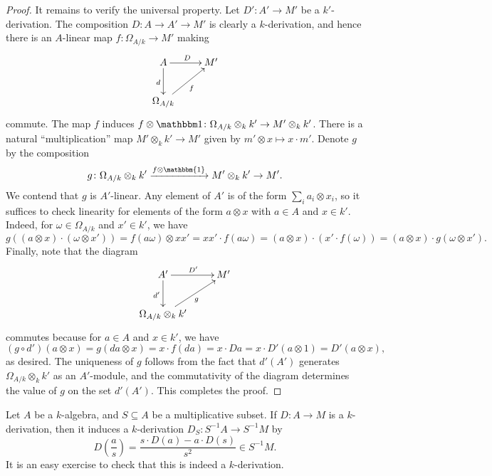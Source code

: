 \documentclass[10pt]{article}
\theoremstyle{thmstyle}
\theoremstyle{defstyle}
\begin{document}
\begin{proof}
    It remains to verify the universal property. Let $D'\colon A'\to M'$ be a $k'$-derivation. The composition $D\colon A\to A'\to M'$ is clearly a $k$-derivation, and hence there is an $A$-linear map $f\colon \Omega_{A/k}\to M'$ making 
    \begin{equation*}
        \xymatrix {
            A\ar[r]^D\ar[d]_d & M'\\
            \Omega_{A/k}\ar[ru]_{f}
        }
    \end{equation*}
    commute. The map $f$ induces $f\otimes\mathbbm 1\colon \Omega_{A/k}\otimes_k k'\to M'\otimes_k k'$. There is a natural ``multiplication'' map $M'\otimes_k k'\to M'$ given by $m'\otimes x\mapsto x\cdot m'$. Denote $g$ by the composition
    \begin{equation*}
        g\colon \Omega_{A/k}\otimes_k k'\xrightarrow{f\otimes\mathbbm{1}} M'\otimes_k k'\to M'.
    \end{equation*}
    We contend that $g$ is $A'$-linear. Any element of $A'$ is of the form $\sum_i a_i\otimes x_i$, so it suffices to check linearity for elements of the form $a\otimes x$ with $a\in A$ and $x\in k'$. Indeed, for $\omega\in\Omega_{A/k}$ and $x'\in k'$, we have 
    \begin{equation*}
        g\left((a\otimes x)\cdot(\omega\otimes x')\right) = f(a\omega)\otimes xx' = xx'\cdot f(a\omega) = (a\otimes x)\cdot (x'\cdot f(\omega)) = (a\otimes x)\cdot g(\omega\otimes x').
    \end{equation*}
    Finally, note that the diagram 
    \begin{equation*}
        \xymatrix {
            A'\ar[d]_{d'}\ar[r]^{D'} & M'\\
            \Omega_{A/k}\otimes_k k'\ar[ru]_{g}
        }
    \end{equation*}
    commutes because for $a\in A$ and $x\in k'$, we have 
    \begin{equation*}
        (g\circ d')(a\otimes x) = g\left(da\otimes x\right) = x\cdot f(da) = x\cdot Da = x\cdot D'(a\otimes 1) = D'(a\otimes x),
    \end{equation*}
    as desired. The uniqueness of $g$ follows from the fact that $d'(A')$ generates $\Omega_{A/k}\otimes_k k'$ as an $A'$-module, and the commutativity of the diagram determines the value of $g$ on the set $d'(A')$. This completes the proof.
\end{proof}

Let $A$ be a $k$-algebra, and $S\subseteq A$ be a multiplicative subset. If $D\colon A\to M$ is a $k$-derivation, then it induces a $k$-derivation $D_S\colon S^{-1}A\to S^{-1}M$ by 
\begin{equation*}
    D\left(\frac{a}{s}\right) = \frac{s\cdot D(a) - a\cdot D(s)}{s^2}\in S^{-1}M.
\end{equation*}
It is an easy exercise to check that this is indeed a $k$-derivation.
\end{document}
